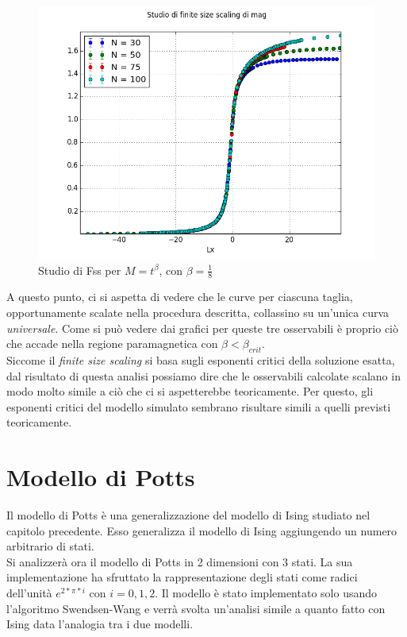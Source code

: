 \begin{center}
	\begin{figure}[h!]
		\includegraphics[scale=0.56]{sw/fssmag.png}
		\caption{Studio di Fss per $M= t^{\beta}$, con $\beta=\frac{1}{8}$}
	\end{figure}
\end{center}

A questo punto, ci si aspetta di vedere che le curve per ciascuna taglia, opportunamente scalate nella procedura descritta, collassino su un'unica curva \emph{universale}.
Come si può vedere dai grafici per queste tre osservabili è proprio ciò che accade nella regione paramagnetica con $\beta < \beta_{crit}$.\\
Siccome il \emph{finite size scaling} si basa sugli esponenti critici della soluzione esatta, dal risultato di questa analisi possiamo dire che le osservabili calcolate scalano in modo molto simile a ciò che ci si aspetterebbe teoricamente.
Per questo, gli esponenti critici del modello simulato sembrano risultare simili a quelli previsti teoricamente.

\newpage
\chapter{Modello di Potts}
Il modello di Potts è una generalizzazione del modello di Ising studiato nel capitolo precedente.
Esso generalizza il modello di Ising aggiungendo un numero arbitrario di stati.\\
Si analizzerà ora il modello di Potts in 2 dimensioni con 3 stati. La sua implementazione ha sfruttato la rappresentazione degli stati come radici dell'unità $e^{2*\pi*i}$ con $i=0,1,2$.
Il modello è stato implementato solo usando l'algoritmo Swendsen-Wang e verrà svolta un'analisi simile a quanto fatto con Ising data l'analogia tra i due modelli.


